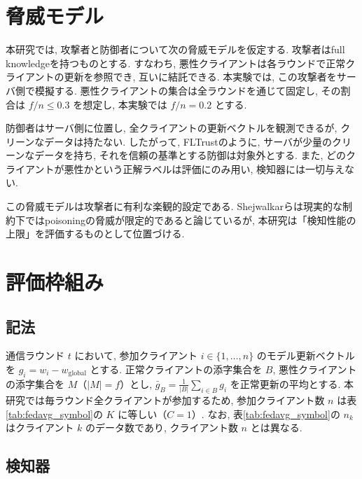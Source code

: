 \documentclass[a4j, twocolumn, dvipdfmx]{jsarticle}
\begin{document}
\section{脅威モデル}
\label{sec:threat}

本研究では, 攻撃者と防御者について次の脅威モデルを仮定する. 攻撃者はfull knowledgeを持つものとする. すなわち, 悪性クライアントは各ラウンドで正常クライアントの更新を参照でき, 互いに結託できる. 本実験では, この攻撃者をサーバ側で模擬する. 悪性クライアントの集合は全ラウンドを通じて固定し, その割合は $f/n \le 0.3$ を想定し, 本実験では $f/n = 0.2$ とする.

防御者はサーバ側に位置し, 全クライアントの更新ベクトルを観測できるが, クリーンなデータは持たない. したがって, FLTrust\cite{cao2021fltrust}のように, サーバが少量のクリーンなデータを持ち, それを信頼の基準とする防御は対象外とする. また, どのクライアントが悪性かという正解ラベルは評価にのみ用い, 検知器には一切与えない.

この脅威モデルは攻撃者に有利な楽観的設定である. Shejwalkarら\cite{shejwalkar2022back}は現実的な制約下ではpoisoningの脅威が限定的であると論じているが, 本研究は「検知性能の上限」を評価するものとして位置づける.

\section{評価枠組み}
\label{sec:framework}

\subsection{記法}

通信ラウンド $t$ において, 参加クライアント $i \in \{1,\dots,n\}$ のモデル更新ベクトルを $g_i = w_i - w_{\text{global}}$ とする. 正常クライアントの添字集合を $B$, 悪性クライアントの添字集合を $M$（$|M| = f$）とし, $\bar{g}_B = \frac{1}{|B|}\sum_{i \in B} g_i$ を正常更新の平均とする. 本研究では毎ラウンド全クライアントが参加するため, 参加クライアント数 $n$ は表\ref{tab:fedavg_symbol}の $K$ に等しい（$C=1$）. なお, 表\ref{tab:fedavg_symbol}の $n_k$ はクライアント $k$ のデータ数であり, クライアント数 $n$ とは異なる.

\subsection{検知器}
\label{sec:detectors}
\end{document}

